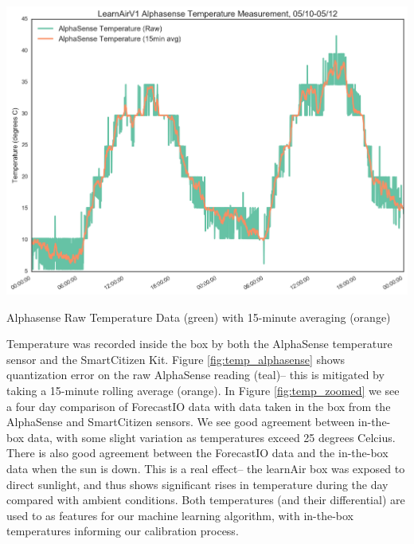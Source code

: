 \begin{marginfigure}[3.5cm]
 	\includegraphics[width=\textwidth]{figs/temp_alphasense}               
 	 \caption{Alphasense Raw Temperature Data (green) with 15-minute averaging (orange)}
  	\label{fig:temp_alphasense}
\end{marginfigure}


Temperature was recorded inside the box by both the AlphaSense temperature sensor and the SmartCitizen Kit.  Figure \ref{fig:temp_alphasense} shows quantization error on the raw AlphaSense reading (teal)-- this is mitigated by taking a 15-minute rolling average (orange).  In Figure \ref{fig:temp_zoomed} we see a four day comparison of ForecastIO data with data taken in the box from the AlphaSense and SmartCitizen sensors.    We see good agreement between in-the-box data, with some slight variation as temperatures exceed 25 degrees Celcius.  There is also good agreement between the ForecastIO data and the in-the-box data when the sun is down.  This is a real effect-- the learnAir box was exposed to direct sunlight, and thus shows significant rises in temperature during the day compared with ambient conditions.  Both temperatures (and their differential) are used to as features for our machine learning algorithm, with in-the-box temperatures informing our calibration process.   


